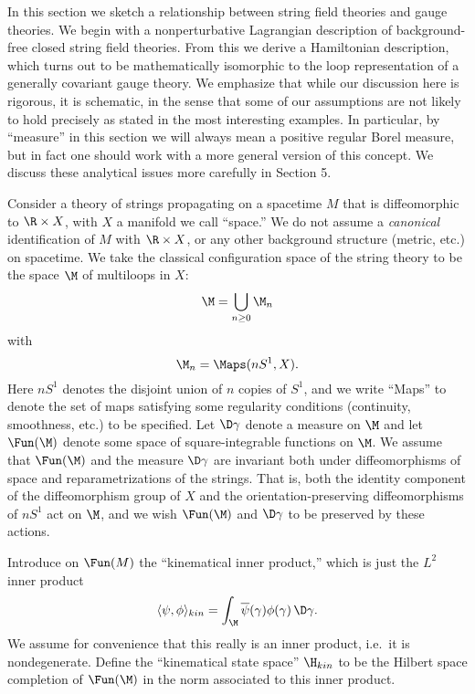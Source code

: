 In this section we sketch a relationship between  string field theories and
gauge theories.   We begin with a nonperturbative Lagrangian description of
background-free closed string field theories. From this we derive a
Hamiltonian description, which turns out to be mathematically isomorphic to
the loop representation of a generally covariant gauge theory.   We
emphasize that while our discussion here is rigorous, it is schematic, in
the sense that some of our assumptions are not likely to hold precisely as
stated in the most interesting examples.   In particular, by ``measure'' in
this section we will always mean a positive regular Borel measure,  but in
fact one should work with a more general version of this concept.   We
discuss these analytical issues more carefully in Section 5.

Consider a theory of strings
propagating on a spacetime $M$ that is diffeomorphic to
$\R\times X$, with $X$ a manifold we call ``space.'' We do not
assume a {\it canonical} identification of $M$ with
$\R\times X$, or any other background structure (metric, etc.) on
spacetime.  We take the classical
configuration space of the string theory to be the space $\M$
of multiloops in $X$:
\[ \M = \bigcup_{n \ge 0} \M_n \]
with
\[ \M_n = \Maps(nS^1, X) .\]
Here $nS^1$ denotes the disjoint union of $n$ copies
of $S^1$, and we write ``Maps'' to denote the set of maps satisfying
some regularity conditions (continuity, smoothness, etc.) to be
specified.  Let $\D\gamma$
denote a measure on $\M$ and let
$\Fun(\M)$ denote some space of square-integrable functions on $\M$.
We assume that $\Fun(\M)$ and the measure
$\D\gamma$ are invariant both under diffeomorphisms of space and
reparametrizations of the strings.  That is, both the
identity component of the diffeomorphism group of $X$ and
the orientation-preserving diffeomorphisms of $nS^1$
act on $\M$, and we wish $\Fun(\M)$ and $\D\gamma$ to be preserved by
these actions.

Introduce on $\Fun(M)$ the ``kinematical inner product,'' which is
just the $L^2$ inner product
\[ \langle \psi,\phi\rangle_{kin} = \int_{\M}
\overline\psi(\gamma) \phi(\gamma) \, \D\gamma  .\]
We assume for convenience that this really is an inner product, i.e.\
it is nondegenerate.
Define the ``kinematical state space''
$\H_{kin}$ to be the Hilbert space completion of
$\Fun(\M)$ in the norm associated to this inner product.

